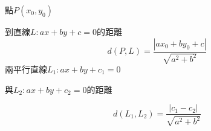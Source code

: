 點$P(x_0, y_0)$ \par
到直線$L:ax+by+c=0$的距離 
\[
    d(P, L)=\frac{|ax_0+by_0+c|}{\sqrt{a^2+b^2}}
\]
兩平行直線$L_1:ax+by+c_1=0$ \par
與$L_2:ax+by+c_2=0$的距離 \par
\[
    d(L_1, L_2) = \frac{|c_1-c_2|}{\sqrt{a^2+b^2}}
\]